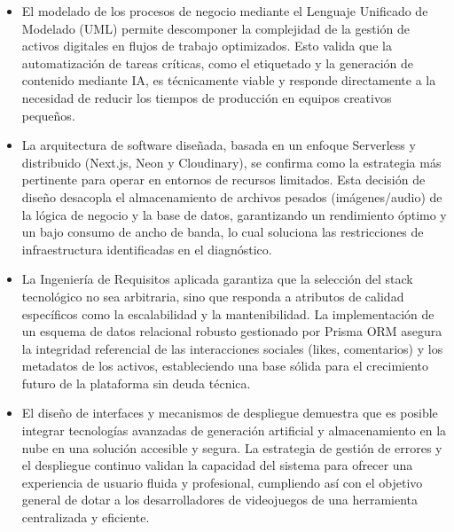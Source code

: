     \begin{itemize}
        \item El modelado de los procesos de negocio mediante el Lenguaje Unificado de Modelado (UML) permite descomponer la complejidad de la gestión de activos digitales en flujos de trabajo optimizados. Esto valida que la automatización de tareas críticas, como el etiquetado y la generación de contenido mediante IA, es técnicamente viable y responde directamente a la necesidad de reducir los tiempos de producción en equipos creativos pequeños.
        \item La arquitectura de software diseñada, basada en un enfoque Serverless y distribuido (Next.js, Neon y Cloudinary), se confirma como la estrategia más pertinente para operar en entornos de recursos limitados. Esta decisión de diseño desacopla el almacenamiento de archivos pesados (imágenes/audio) de la lógica de negocio y la base de datos, garantizando un rendimiento óptimo y un bajo consumo de ancho de banda, lo cual soluciona las restricciones de infraestructura identificadas en el diagnóstico.
        \item La Ingeniería de Requisitos aplicada garantiza que la selección del stack tecnológico no sea arbitraria, sino que responda a atributos de calidad específicos como la escalabilidad y la mantenibilidad. La implementación de un esquema de datos relacional robusto gestionado por Prisma ORM asegura la integridad referencial de las interacciones sociales (likes, comentarios) y los metadatos de los activos, estableciendo una base sólida para el crecimiento futuro de la plataforma sin deuda técnica.
        \item El diseño de interfaces y mecanismos de despliegue demuestra que es posible integrar tecnologías avanzadas de generación artificial y almacenamiento en la nube en una solución accesible y segura. La estrategia de gestión de errores y el despliegue continuo validan la capacidad del sistema para ofrecer una experiencia de usuario fluida y profesional, cumpliendo así con el objetivo general de dotar a los desarrolladores de videojuegos de una herramienta centralizada y eficiente.
    \end{itemize}



